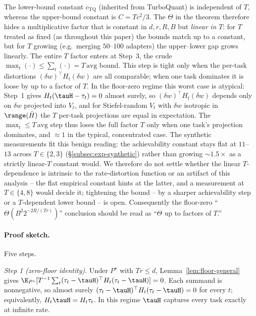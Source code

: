 \begin{remark}
\label{rem:tgap}
The lower-bound constant $c_{\mathrm{TQ}}$ (inherited from
TurboQuant) is independent of $T$, whereas the upper-bound
constant is $C = Tc^2/3$. The $\Theta$ in the theorem therefore
hides a multiplicative factor that is constant in $d, r, R, B$ but
\emph{linear in $T$}: for $T$ treated as fixed (as throughout this
paper) the bounds match up to a constant, but for $T$ growing
(e.g.\ merging $50$--$100$ adapters) the upper--lower gap grows
linearly. The entire $T$ factor enters at Step~3, the crude
$\max_t (\cdot) \leq \sum_t(\cdot) = T\,\mathrm{avg}$ bound. This
step is tight only when the per-task distortions
$(\delta w)^\top H_t (\delta w)$ are all comparable; when one task
dominates it is loose by up to a factor of $T$. In the floor-zero
regime this worst case is atypical: Step~1 gives
$H_t(\tauH - \tau_t) = 0$ almost surely, so
$(\delta w)^\top H_t(\delta w)$ depends only on $\delta w$
projected into $V_t$, and for Stiefel-random $V_t$ with $\delta w$
isotropic in $\range(\bar H)$ the $T$ per-task projections are
equal in expectation. The $\max_t \leq T\,\mathrm{avg}$ step thus
loses the full factor $T$ only when one task's projection
dominates, and $\approx 1$ in the typical, concentrated case. The
synthetic measurements fit this benign reading: the achievability
constant stays flat at $11$--$13$ across $T \in \{2,3\}$
(\S\ref{subsec:exp-synthetic}) rather than growing $\sim\!1.5\times$
as a strictly linear-$T$ constant would. We therefore do not
settle whether the linear $T$-dependence is intrinsic to the
rate-distortion function or an artifact of this analysis -- the
flat empirical constant hints at the latter, and a measurement at
$T \in \{4,8\}$ would decide it; tightening the bound -- by a
sharper achievability step or a $T$-dependent lower bound -- is
open. Consequently the floor-zero
``$\Theta(B^2 2^{-2R/(Tr)})$'' conclusion should be read as
``$\Theta$ up to factors of $T$.''
\end{remark}

\paragraph{Proof sketch.} Five steps.

\emph{Step 1 (zero-floor identity).} Under $P^\star$ with
$Tr\leq d$, Lemma~\ref{lem:floor-general} gives
$\E_{P^\star}[T^{-1}\sum_t(\tau_t-\tauH)^\top H_t(\tau_t-\tauH)]
= 0$. Each summand is nonnegative, so almost surely
$(\tau_t - \tauH)^\top H_t(\tau_t-\tauH) = 0$ for every $t$;
equivalently, $H_t\tauH = H_t\tau_t$. In this regime $\tauH$
captures every task exactly at infinite rate.

